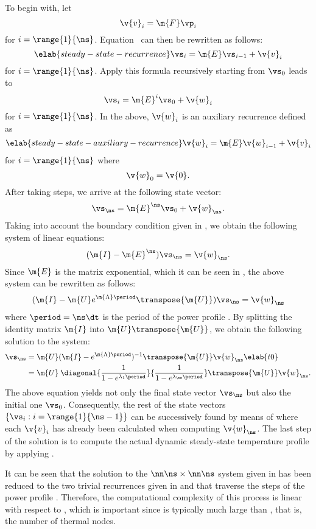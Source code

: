 To begin with, let
\[
  \v{v}_i = \m{F} \vp_i
\]
for $i = \range{1}{\ns}$. Equation~ can then be rewritten as
follows:
\begin{equation} \elab{steady-state-recurrence}
  \vs_i = \m{E} \vs_{i - 1} + \v{v}_i
\end{equation}
for $i = \range{1}{\ns}$. Apply this formula recursively starting from $\vs_0$
leads to
\[
  \vs_i = \m{E}^i \vs_0 + \v{w}_i
\]
for $i = \range{1}{\ns}$. In the above, $\v{w}_i$ is an auxiliary recurrence
defined as
\begin{equation} \elab{steady-state-auxiliary-recurrence}
  \v{w}_i = \m{E} \v{w}_{i - 1} + \v{v}_i
\end{equation}
for $i = \range{1}{\ns}$ where
\[
  \v{w}_0 = \v{0}.
\]
After taking \ns steps, we arrive at the following state vector:
\[
  \vs_\ns = \m{E}^\ns \vs_0 + \v{w}_\ns.
\]
Taking into account the boundary condition given in ,
we obtain the following system of linear equations:
\[
  (\m{I} - \m{E}^\ns) \vs_\ns = \v{w}_\ns.
\]
Since $\m{E}$ is the matrix exponential, which it can be seen in
, the above system can be rewritten as follows:
\[
  (\m{I} - \m{U} e^{\m{\Lambda} \period} \transpose{\m{U}}) \vs_\ns = \v{w}_\ns
\]
where $\period = \ns \dt$ is the period of the power profile \mp. By splitting
the identity matrix $\m{I}$ into $\m{U} \transpose{\m{U}}$, we obtain the
following solution to the system:
\begin{align}
  \vs_\ns
  & = \m{U} (\m{I} - e^{\m{\Lambda} \period})^{-1} \transpose{\m{U}} \v{w}_\ns \elab{t0} \\
  & = \m{U} \: \diagonal{\frac{1}{1 - e^{\lambda_1 \period}}}{\frac{1}{1 - e^{\lambda_\ns \period}}} \transpose{\m{U}} \v{w}_\ns. \nonumber
\end{align}
The above equation yields not only the final state vector $\vs_\ns$ but also the
initial one $\vs_0$. Consequently, the rest of the state vectors $\{ \vs_i: i =
\range{1}{\ns - 1} \}$ can be successively found by means of
 where each $\v{v}_i$ has already been calculated
when computing $\v{w}_\ns$. The last step of the solution is to compute the
actual dynamic steady-state temperature profile \mq by applying
.

It can be seen that the solution to the $\nn \ns \times \nn \ns$ system given in
 has been reduced to the two trivial recurrences given
in  and 
that traverse the \ns steps of the power profile \mp. Therefore, the
computational complexity of this process is linear with respect to \ns, which is
important since \ns is typically much large than \nn, that is, the number of
thermal nodes.

